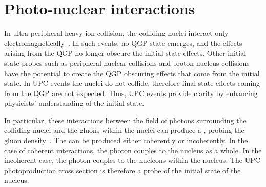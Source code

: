 \chapter{Photo-nuclear interactions \label{ch:photoNuc}}
    In ultra-peripheral heavy-ion collision, the colliding nuclei interact only 
      electromagnetically~\cite{Baltz:2007kq,Bertulani:2005ru}.   
    In such events, no QGP state emerges, and the effects arising from the QGP 
      no longer obscure the initial state effects.
    Other initial state probes such as peripheral nuclear collisions and 
      proton-nucleus collisions have the potential to create the QGP obscuring 
      effects that come from the initial state.
    In UPC events the nuclei do not collide, therefore final state effects coming
      from the QGP are not expected. 
    Thus, UPC events provide clarity by enhancing physicists' 
      understanding of the initial state. 
    
    In particular, these interactions between the field of photons surrounding 
      the colliding nuclei and the gluons within the nuclei can produce a 
      \JPsi{}, probing the gluon density~\cite{Ryskin:1992ui,Brodsky:1994kf}.
    The \JPsi{} can be produced either coherently or incoherently. 
    In the case of coherent interactions, the photon couples to the nucleus 
      as a whole.
    In the incoherent case, the photon couples to the nucleons within the 
      nucleus.
    The UPC \JPsi{} photoproduction cross section is therefore a probe of 
      the initial state of the nucleus.

